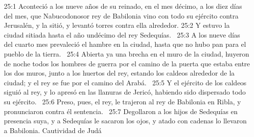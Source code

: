 25:1 Aconteció a los nueve años de su reinado, en el mes décimo, a los diez días del mes, que Nabucodonosor rey de Babilonia vino con todo su ejército contra Jerusalén, y la sitió, y levantó torres contra ella alrededor. 
25:2 Y estuvo la ciudad sitiada hasta el año undécimo del rey Sedequías.  
25:3 A los nueve días del cuarto mes prevaleció el hambre en la ciudad, hasta que no hubo pan para el pueblo de la tierra.  
25:4 Abierta ya una brecha en el muro de la ciudad, huyeron de noche todos los hombres de guerra por el camino de la puerta que estaba entre los dos muros, junto a los huertos del rey, estando los caldeos alrededor de la ciudad; y el rey se fue por el camino del Arabá.  
25:5 Y el ejército de los caldeos siguió al rey, y lo apresó en las llanuras de Jericó, habiendo sido dispersado todo su ejército.  
25:6 Preso, pues, el rey, le trajeron al rey de Babilonia en Ribla, y pronunciaron contra él sentencia.  
25:7 Degollaron a los hijos de Sedequías en presencia suya, y a Sedequías le sacaron los ojos, y atado con cadenas lo llevaron a Babilonia. 
Cautividad de Judá  

